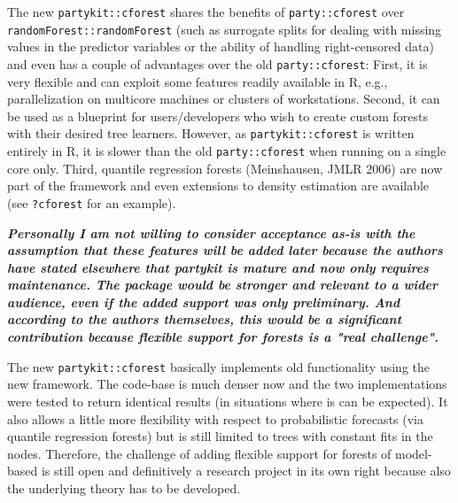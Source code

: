 \documentclass{article}
\begin{document}
\smallskip

The new \texttt{partykit::cforest} shares the benefits of
\texttt{party::cforest} over \texttt{randomForest::randomForest} (such as surrogate
splits for dealing with missing values in the predictor variables or the
ability of handling right-censored data) and even has a couple of
advantages over the old \texttt{party::cforest}: First, it is very flexible
and can exploit some features readily available in R, e.g., parallelization
on multicore machines or clusters of workstations.  Second, it can be used
as a blueprint for users/developers who wish to create custom forests with
their desired tree learners.  However, as \texttt{partykit::cforest} is
written entirely in R, it is slower than the old \texttt{party::cforest}
when running on a single core only. Third, quantile regression forests
(Meinshausen, JMLR 2006) are now part of the framework and even extensions
to density estimation are available (see \texttt{?cforest} for an example).

\textbf{\textit{%
Personally I am not willing to consider acceptance as-is with the assumption
that these features will be added later because the authors have stated
elsewhere that partykit is mature and now only requires maintenance.
The package would be stronger and relevant to a wider audience, even if the
added support was only preliminary.  And according to the authors
themselves, this would be a significant contribution because flexible
support for forests is a "real challenge".
}}

\smallskip

The new \texttt{partykit::cforest} basically implements old functionality
using the new framework. The code-base is much denser now and the two
implementations were tested to return identical results (in situations where
is can be expected). It also allows a little more flexibility with respect
to probabilistic forecasts (via quantile regression forests) but is still
limited to trees with constant fits in the nodes. Therefore, the challenge
of adding flexible support for forests of model-based is still open and
definitively a research project in its own right because also the underlying
theory has to be developed.
\end{document}
